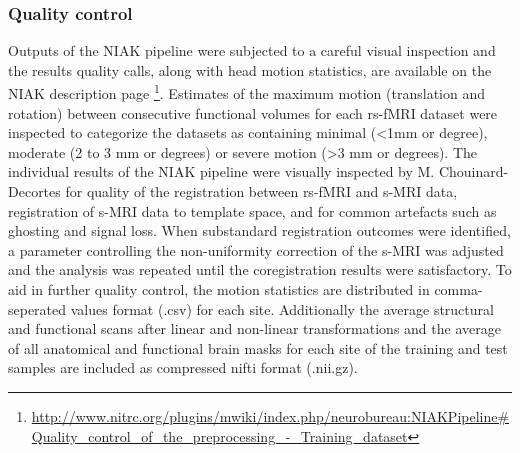 \documentclass[preprint,12pt,3p]{elsarticle}
\begin{document}
\subsubsection{Quality control}

Outputs of the NIAK pipeline were subjected to a careful visual inspection and the results quality calls, along with head motion statistics, are available on the NIAK description page \footnote{\url{http://www.nitrc.org/plugins/mwiki/index.php/neurobureau:NIAKPipeline#Quality_control_of_the_preprocessing_-_Training_dataset}}. Estimates of the maximum motion (translation and rotation) between consecutive functional volumes for each rs-fMRI dataset were inspected to categorize the datasets as containing minimal (<1mm or degree), moderate (2 to 3 mm or degrees) or severe motion (>3 mm or degrees). The individual results of the NIAK pipeline were visually inspected by M. Chouinard-Decortes for quality of the registration between rs-fMRI and s-MRI data, registration of s-MRI data to template space, and for common artefacts such as ghosting and signal loss. When substandard registration outcomes were identified, a parameter controlling the non-uniformity correction of the s-MRI was adjusted and the analysis was repeated until the coregistration results were satisfactory. To aid in further quality control, the motion statistics are distributed in comma-seperated values format (.csv) for each site. Additionally the average structural and functional scans after linear and non-linear transformations and the average of all anatomical and functional brain masks for each site of the training and test samples are included as compressed nifti format (.nii.gz)\cite{lavoie2012integration}. 

\end{document}
